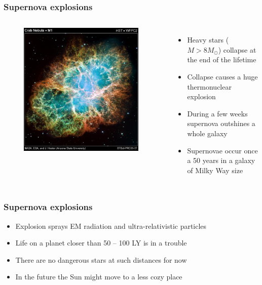 \documentclass{beamer}
\begin{document}
\begin{frame}
\frametitle{Supernova explosions}
\begin{columns}[c]
\begin{figure}
\includegraphics[width=0.95\textwidth]{img/crab_nebula_web_print.jpg}
\end{figure}
\begin{itemize}
\item Heavy stars ($M > 8 M_\odot$) collapse at the end of the lifetime
\item Collapse causes a huge thermonuclear explosion
\item During a few weeks supernova outshines a whole galaxy
\item Supernovae occur once a 50 years in a galaxy of Milky Way size
\end{itemize}
\end{columns}
\end{frame}

\begin{frame}
\frametitle{Supernova explosions}
\begin{itemize}
\item Explosion sprays EM radiation and ultra-relativistic particles
\item Life on a planet closer than 50 -- 100 LY is in a trouble
\item There are no dangerous stars at such distances for now
\item In the future the Sun might move to a less cozy place
\end{itemize}
\end{frame}
\end{document}
